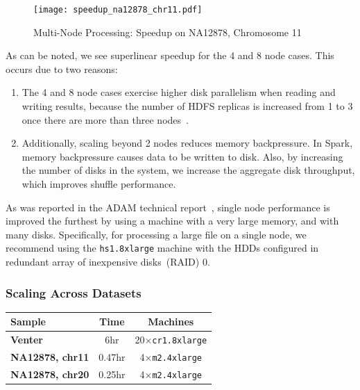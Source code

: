 \documentclass{acm_proc_article-sp}
\begin{document}
\begin{figure}[h]
\begin{center}
\texttt{[image: speedup\_na12878\_chr11.pdf]}
\end{center}
\caption{Multi-Node Processing: Speedup on NA12878, Chromosome 11}
\label{fig:speedup}
\end{figure}

As can be noted, we see superlinear speedup for the 4 and 8 node cases. This occurs due to two reasons:

\begin{enumerate}
\item The 4 and 8 node cases exercise higher disk parallelism when reading and writing results, because the number of HDFS replicas
is increased from 1 to 3 once there are more than three nodes~\cite{borthakur07}.
\item Additionally, scaling beyond 2 nodes reduces memory backpressure. In Spark, memory backpressure causes data to be written to
disk. Also, by increasing the number of disks in the system, we increase the aggregate disk throughput, which improves shuffle performance.
\end{enumerate}

As was reported in the ADAM technical report~\cite{massie13}, single node performance is improved the furthest by using a machine
with a very large memory, and with many disks. Specifically, for processing a large file on a single node, we recommend using the
\texttt{hs1.8xlarge} machine with the HDDs configured in redundant array of inexpensive disks~(RAID) 0.

\subsubsection{Scaling Across Datasets}
\label{sec:scaling-across-datasets}

\begin{table}[h]
\begin{center}
\begin{tabular}{| l || c | c |}
\hline
\bf Sample & \bf Time & \bf Machines \\
\hline
\hline
\bf Venter & 6hr & 20$\times$\texttt{cr1.8xlarge} \\
\bf NA12878, chr11 & 0.47hr & 4$\times$\texttt{m2.4xlarge} \\
\bf NA12878, chr20 & 0.25hr & 4$\times$\texttt{m2.4xlarge} \\
\hline
\end{tabular}
\end{center}
\end{table}
\end{document}
